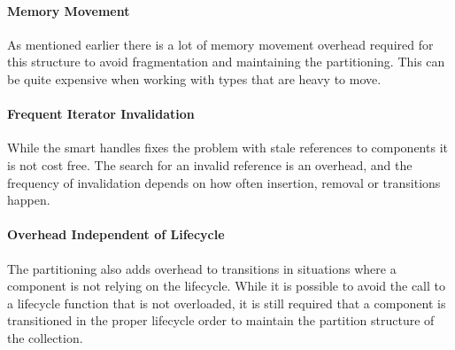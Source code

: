 \paragraph{Memory Movement}
As mentioned earlier there is a lot of memory movement overhead required for this structure to avoid fragmentation and
maintaining the partitioning. This can be quite expensive when working with types that are heavy to move.

\paragraph{Frequent Iterator Invalidation}
While the smart handles fixes the problem with stale references to components it is not cost free.
The search for an invalid reference is an overhead, and the frequency of invalidation depends on how often insertion,
removal or transitions happen.

\paragraph{Overhead Independent of Lifecycle}
The partitioning also adds overhead to transitions in situations where a component is not relying on the lifecycle.
While it is possible to avoid the call to a lifecycle function that is not overloaded, it is still required
that a component is transitioned in the proper lifecycle order to maintain the partition structure of the collection.
